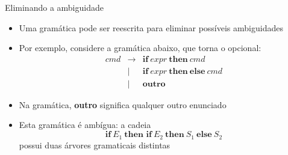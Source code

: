 \begin{frame}[fragile]{Eliminando a ambiguidade}

    \begin{itemize}
        \item Uma gramática pode ser reescrita para eliminar possíveis ambiguidades
        \pause

        \item Por exemplo, considere a gramática abaixo, que torna o  opcional:
        \[
            \begin{array}{rcl}
                cmd & \to & \textbf{if}\ expr\ \textbf{then}\ cmd \\
                & | & \textbf{if}\ expr\ \textbf{then}\ \textbf{else}\ cmd \\
                & | & \textbf{outro}
            \end{array}
        \]
        \pause

        \item Na gramática, \textbf{outro} significa qualquer outro enunciado
        \pause

        \item Esta gramática é ambígua: a cadeia
        \[
            \textbf{if}\ E_1\ \textbf{then if}\ E_2\ \textbf{then}\ S_1\ \textbf{else}\ S_2
        \]
        possui duas árvores gramaticais distintas
    \end{itemize}

\end{frame}


